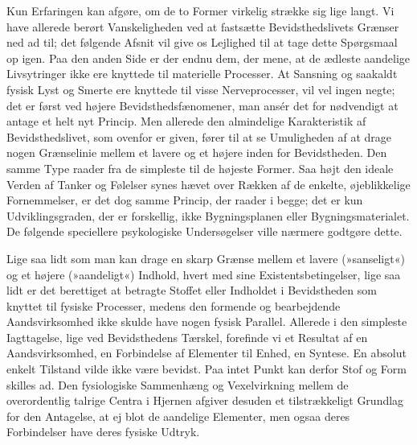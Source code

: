 \documentclass[12pt,a4paper,openany]{book}
\newcommand{\opage}[1]{\marginnote{\footnotesize\textit{[#1]}}}
\begin{document}
Kun Erfaringen kan afgøre, om de to Former virkelig strække sig lige
langt. Vi have allerede berørt Vanskeligheden ved at fastsætte
Bevidsthedslivets Grænser ned ad til; det følgende Afsnit vil give os
Lejlighed til at tage dette Spørgsmaal op igen. Paa den anden Side er
der endnu dem, der mene, at de ædleste aandelige Livsytringer ikke ere
knyttede til materielle Processer. At Sansning og saakaldt fysisk Lyst
og Smerte ere knyttede til visse Nerveprocesser, vil vel ingen negte;
det er først ved højere Bevidsthedsfænomener, man ansér det for
nødvendigt at antage et helt nyt Princip. Men allerede den almindelige
Karakteristik af Bevidsthedslivet, som ovenfor er given, fører til at se
Umuligheden af at drage nogen Grænselinie mellem et lavere og et højere
inden for Bevidstheden. Den samme Type raader fra de simpleste til de
højeste Former. Saa højt den ideale Verden af Tanker og Følelser
\opage{78}synes hævet over Rækken af de enkelte, øjeblikkelige
Fornemmelser, er det dog samme Princip, der raader i begge; det er kun
Udviklingsgraden, der er forskellig, ikke Bygningsplanen eller
Bygningsmaterialet. De følgende speciellere psykologiske Undersøgelser
ville nærmere godtgøre dette.

Lige saa lidt som man kan drage en skarp Grænse mellem et lavere
(»sanseligt«) og et højere (»aandeligt«) Indhold, hvert med sine
Existentsbetingelser, lige saa lidt er det berettiget at betragte
Stoffet eller Indholdet i Bevidstheden som knyttet til fysiske
Processer, medens den formende og bearbejdende Aandsvirksomhed ikke
skulde have nogen fysisk Parallel. Allerede i den simpleste Iagttagelse,
lige ved Bevidsthedens Tærskel, forefinde vi et Resultat af en
Aandsvirksomhed, en Forbindelse af Elementer til Enhed, en Syntese. En
absolut enkelt Tilstand vilde ikke være bevidst. Paa intet Punkt kan
derfor Stof og Form skilles ad. Den fysiologiske Sammenhæng og
Vexelvirkning mellem de overordentlig talrige Centra i Hjernen afgiver
desuden et tilstrækkeligt Grundlag for den Antagelse, at ej blot de
aandelige Elementer, men ogsaa deres Forbindelser have deres fysiske
Udtryk.
\end{document}
